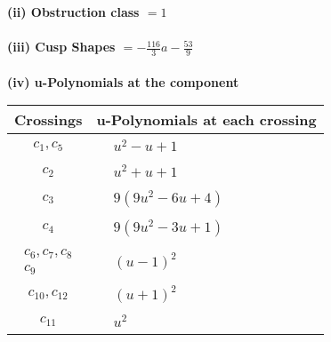 \documentclass[1p]{elsarticle_modified}
\theoremstyle{definition}
\begin{document}
\flushleft \textbf{(ii) Obstruction class $= 1$}\\~\\
\flushleft \textbf{(iii) Cusp Shapes $= -\frac{116}{3} a-\frac{53}{9}$}\\~\\
\newpage\renewcommand{\arraystretch}{1}
\flushleft \textbf{(iv) u-Polynomials at the component}\newline \\
\begin{tabular}{m{50pt}|m{274pt}}
Crossings & \hspace{64pt}u-Polynomials at each crossing \\
\hline $$\begin{aligned}c_{1},c_{5}\end{aligned}$$&$\begin{aligned}
&u^2- u+1
\end{aligned}$\\
\hline $$\begin{aligned}c_{2}\end{aligned}$$&$\begin{aligned}
&u^2+u+1
\end{aligned}$\\
\hline $$\begin{aligned}c_{3}\end{aligned}$$&$\begin{aligned}
&9(9 u^2-6 u+4)
\end{aligned}$\\
\hline $$\begin{aligned}c_{4}\end{aligned}$$&$\begin{aligned}
&9(9 u^2-3 u+1)
\end{aligned}$\\
\hline $$\begin{aligned}c_{6},c_{7},c_{8}\\c_{9}\end{aligned}$$&$\begin{aligned}
&(u-1)^2
\end{aligned}$\\
\hline $$\begin{aligned}c_{10},c_{12}\end{aligned}$$&$\begin{aligned}
&(u+1)^2
\end{aligned}$\\
\hline $$\begin{aligned}c_{11}\end{aligned}$$&$\begin{aligned}
&u^2
\end{aligned}$\\
\hline
\end{tabular}\\~\\
\end{document}
